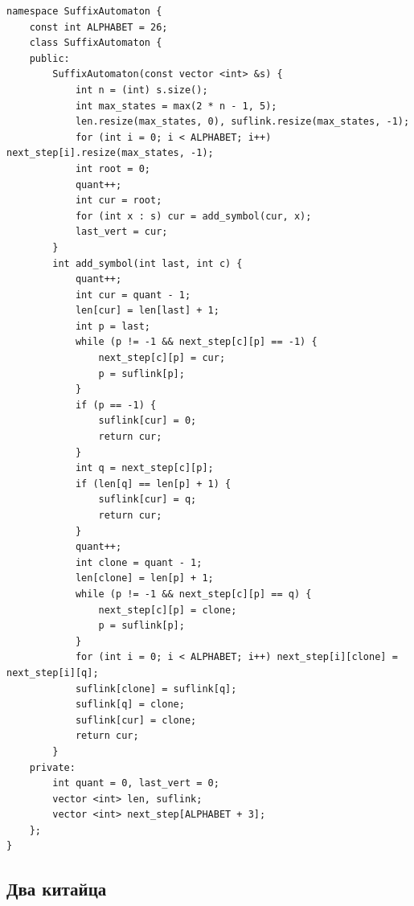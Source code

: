 \documentclass[10pt, portrait,letterpaper]{article}
\begin{document}
\begin{verbatim}
namespace SuffixAutomaton {
    const int ALPHABET = 26;
    class SuffixAutomaton {
    public:
        SuffixAutomaton(const vector <int> &s) {
            int n = (int) s.size();
            int max_states = max(2 * n - 1, 5);
            len.resize(max_states, 0), suflink.resize(max_states, -1);
            for (int i = 0; i < ALPHABET; i++) next_step[i].resize(max_states, -1);
            int root = 0; 
            quant++;
            int cur = root;
            for (int x : s) cur = add_symbol(cur, x);	
            last_vert = cur;
        }
        int add_symbol(int last, int c) {
            quant++;
            int cur = quant - 1;
            len[cur] = len[last] + 1;
            int p = last;
            while (p != -1 && next_step[c][p] == -1) {
                next_step[c][p] = cur;
                p = suflink[p];
            }
            if (p == -1) {
                suflink[cur] = 0;
                return cur; 	
            }
            int q = next_step[c][p];
            if (len[q] == len[p] + 1) {
                suflink[cur] = q;
                return cur;
            }
            quant++;
            int clone = quant - 1;
            len[clone] = len[p] + 1;
            while (p != -1 && next_step[c][p] == q) {
                next_step[c][p] = clone;
                p = suflink[p];
            }
            for (int i = 0; i < ALPHABET; i++) next_step[i][clone] = next_step[i][q];
            suflink[clone] = suflink[q];
            suflink[q] = clone;
            suflink[cur] = clone;
            return cur;
        }
    private:
        int quant = 0, last_vert = 0;
        vector <int> len, suflink;
        vector <int> next_step[ALPHABET + 3];
    };
}
\end{verbatim}

\subsection{Два китайца}
\end{document}
